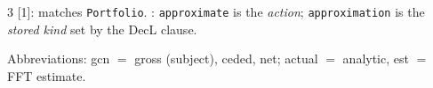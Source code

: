 \begin{multicols*}{3}
[1]: matches \texttt{Portfolio}. \quad [2]: \texttt{approximate} is the \emph{action}; \texttt{approximation} is the \emph{stored kind} set by the DecL clause.

Abbreviations: gcn $=$ gross (subject), ceded, net; actual $=$ analytic, est $=$ FFT estimate.


\makefooter



\end{multicols*}


